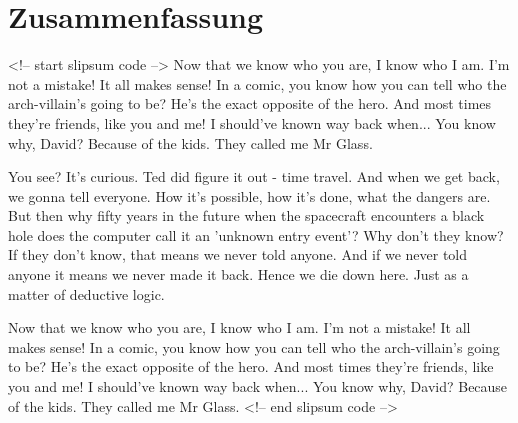 \chapter{Zusammenfassung}

<!-- start slipsum code -->
Now that we know who you are, I know who I am. I'm not a mistake! It all makes sense! In a comic, you know how you can tell who the arch-villain's going to be? He's the exact opposite of the hero. And most times they're friends, like you and me! I should've known way back when... You know why, David? Because of the kids. They called me Mr Glass.

You see? It's curious. Ted did figure it out - time travel. And when we get back, we gonna tell everyone. How it's possible, how it's done, what the dangers are. But then why fifty years in the future when the spacecraft encounters a black hole does the computer call it an 'unknown entry event'? Why don't they know? If they don't know, that means we never told anyone. And if we never told anyone it means we never made it back. Hence we die down here. Just as a matter of deductive logic.

Now that we know who you are, I know who I am. I'm not a mistake! It all makes sense! In a comic, you know how you can tell who the arch-villain's going to be? He's the exact opposite of the hero. And most times they're friends, like you and me! I should've known way back when... You know why, David? Because of the kids. They called me Mr Glass.
<!-- end slipsum code --> 


\cleardoubleemptypage
\thispagestyle{empty}